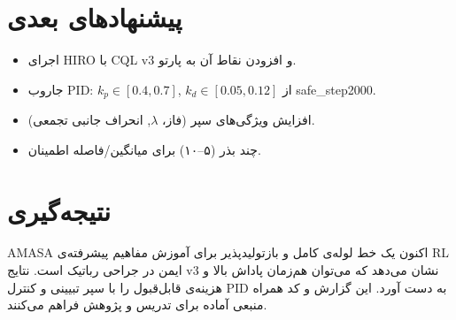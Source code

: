 \documentclass[conference]{IEEEtran}
\begin{document}
\section{پیشنهادهای بعدی}
\begin{itemize}[leftmargin=*]
    \item اجرای HIRO با CQL v3 و افزودن نقاط آن به پارتو.
    \item جاروب PID: $k_p\!\in\![0.4,0.7]$, $k_d\!\in\![0.05,0.12]$ از safe\_step2000.
    \item افزایش ویژگی‌های سپر (فاز، $\lambda$, انحراف جانبی تجمعی).
    \item چند بذر (۵–۱۰) برای میانگین/فاصله اطمینان.
\end{itemize}

\section{نتیجه‌گیری}
AMASA اکنون یک خط لوله‌ی کامل و بازتولیدپذیر برای آموزش مفاهیم پیشرفته‌ی RL ایمن در جراحی رباتیک است. نتایج v3 نشان می‌دهد که می‌توان هم‌زمان پاداش بالا و هزینه‌ی قابل‌قبول را با سپر تبیینی و کنترل PID به دست آورد. این گزارش و کد همراه منبعی آماده برای تدریس و پژوهش فراهم می‌کنند.
\end{document}
